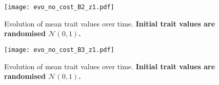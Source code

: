 \documentclass[12pt]{article}
\begin{document}
\begin{figure}
\begin{center}		
\texttt{[image: evo\_no\_cost\_B2\_z1.pdf]}
\end{center}
\caption{Evolution of mean trait values over time. \textbf{Initial trait values are randomised $\mathcal{N}\left(0,1\right)$.}}
\end{figure}

\begin{figure}
\begin{center}				
\texttt{[image: evo\_no\_cost\_B3\_z1.pdf]}
\end{center}
\caption{Evolution of mean trait values over time. \textbf{Initial trait values are randomised $\mathcal{N}\left(0,1\right)$.}}
\end{figure}

\clearpage

\end{document}
